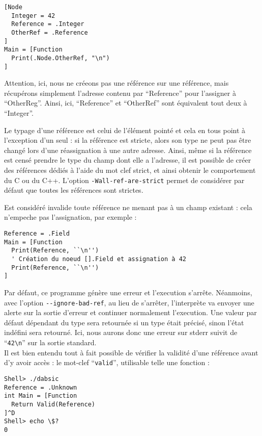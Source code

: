 \documentclass[a5paper, 12pt]{book}
\begin{document}
\begin{verbatim}
[Node
  Integer = 42
  Reference = .Integer
  OtherRef = .Reference
]
Main = [Function
  Print(.Node.OtherRef, "\n")
]
\end{verbatim}

Attention, ici, nous ne créeons pas une référence sur une référence,
mais récupérons simplement l'adresse contenu par ``Reference'' pour
l'assigner à ``OtherReg''. Ainsi, ici, ``Reference'' et ``OtherRef''
sont équivalent tout deux à ``Integer''.

Le typage d'une référence est celui de l'élément pointé et cela en
tous point à l'exception d'un seul : si la référence est stricte,
alors son type ne peut pas être changé lors d'une réassignation
à une autre adresse. Ainsi, même si la référence est censé prendre
le type du champ dont elle a l'adresse, il est possible de créer
des références dédiés à l'aide du mot clef strict, et ainsi obtenir
le comportement du C ou du C++. L'option \verb!-Wall-ref-are-strict! permet
de considérer par défaut que toutes les références sont strictes.

\newpage

Est considéré invalide toute référence ne menant pas à un champ
existant : cela n'empeche pas l'assignation, par exemple :

\begin{verbatim}
Reference = .Field
Main = [Function
  Print(Reference, ``\n'')
  ' Création du noeud [].Field et assignation à 42
  Print(Reference, ``\n'')
]
\end{verbatim}

Par défaut, ce programme génère une erreur et l'execution s'arrête.
Néanmoins, avec l'option \verb!--ignore-bad-ref!, au lieu de s'arrêter,
l'interprète va envoyer une alerte sur la sortie d'erreur et
continuer normalement l'execution. Une valeur par défaut
dépendant du type sera retournée si un type était précisé,
sinon l'état indéfini sera retourné.
Ici, nous aurons donc une erreur sur stderr suivit de ``\verb!42\n!''
sur la sortie standard.\\

Il est bien entendu tout à fait possible de vérifier la validité
d'une référence avant d'y avoir accès : le mot-clef ``\verb!valid!'',
utilisable telle une fonction :\\

\begin{verbatim}
Shell> ./dabsic
Reference = .Unknown
int Main = [Function
  Return Valid(Reference)
]^D
Shell> echo \$?
0
\end{verbatim}
\end{document}

